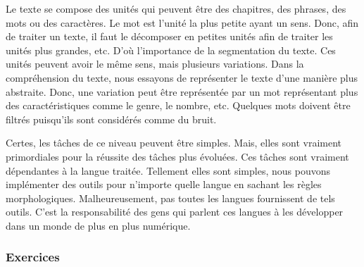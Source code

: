 \documentclass{KodeBook}
\begin{document}
	Le texte se compose des unités qui peuvent être des chapitres, des phrases, des mots ou des caractères.
	Le mot est l'unité la plus petite ayant un sens. 
	Donc, afin de traiter un texte, il faut le décomposer en petites unités  afin de traiter les unités plus grandes, etc. 
	D'où l'importance de la segmentation du texte. 
	Ces unités peuvent avoir le même sens, mais plusieurs variations. 
	Dans la compréhension du texte, nous essayons de représenter le texte d'une manière plus abstraite.
	Donc, une variation peut être représentée par un mot représentant plus des caractéristiques comme le genre, le nombre, etc. 
	Quelques mots doivent être filtrés puisqu'ils sont considérés comme du bruit.
	
	Certes, les tâches de ce niveau peuvent être simples. 
	Mais, elles sont vraiment primordiales pour la réussite des tâches plus évoluées. 
	Ces tâches sont vraiment dépendantes à la langue traitée.
	Tellement elles sont simples, nous pouvons implémenter des outils pour n'importe quelle langue en sachant les règles morphologiques. 
	Malheureusement, pas toutes les langues fournissent de tels outils.  
	C'est la responsabilité des gens qui parlent ces langues à les développer dans un monde de plus en plus numérique.
	

	
\subsubsection*{Exercices}
\end{document}
